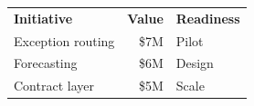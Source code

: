 {\small
\renewcommand{\arraystretch}{1.18}
\begin{tabular}{@{}>{\raggedright\arraybackslash}p{22mm}r >{\raggedright\arraybackslash}p{20mm}@{}}
\textbf{Initiative} & \textbf{Value} & \textbf{Readiness}\\[2pt]
Exception routing & \$7M & Pilot\\
Forecasting & \$6M & Design\\
Contract layer & \$5M & Scale\\
\end{tabular}
}
